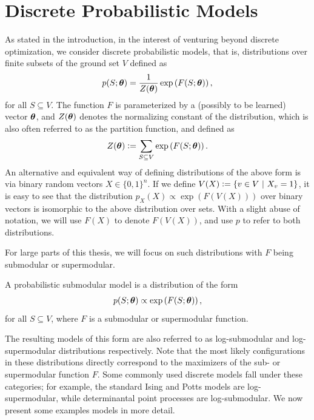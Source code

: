 \section{Discrete Probabilistic Models}
As stated in the introduction, in the interest of venturing beyond discrete optimization, we consider discrete probabilistic models, that is, distributions over finite subsets of the ground set $V$ defined as
\begin{align*}
p(S; \bm{\theta}) = \frac{1}{Z(\bm{\theta})} \exp\left( F(S; \bm{\theta}) \right),
\end{align*}
for all $S \subseteq V$.
The function $F$ is parameterized by a (possibly to be learned) vector $\bm{\theta}$, and $Z(\bm{\theta})$ denotes the normalizing constant of the distribution, which is also often referred to as the partition function, and defined as
\begin{align*}
Z(\bm{\theta}) \vcentcolon= \sum_{S \subseteq V} \exp\left( F(S; \bm{\theta}) \right).
\end{align*}
An alternative and equivalent way of defining distributions of the above form is via binary random vectors $X \in \{0, 1\}^n$.
If we define $V(X) \vcentcolon= \left\{v \in V\ \middle\vert\  X_v = 1\right\}$, it is easy to see that the distribution $p_X(X) \propto \exp(F(V(X)))$ over binary vectors is isomorphic to the above distribution over sets.
With a slight abuse of notation, we will use $F(X)$ to denote $F(V(X))$, and use $p$ to refer to both distributions.

For large parts of this thesis, we will focus on such distributions with $F$ being submodular or supermodular.
\begin{definition}
A probabilistic submodular model \citep{djolonga14,gotovos15} is a distribution of the form
\begin{align*}
p(S; \bm{\theta}) \propto \exp\left( F(S; \bm{\theta}) \right),
\end{align*}
for all $S \subseteq V$, where $F$ is a submodular or supermodular function.
\end{definition}
The resulting models of this form are also referred to as log-submodular and log-supermodular distributions respectively.
Note that the most likely configurations in these distributions directly correspond to the maximizers of the sub- or supermodular function $F$.
Some commonly used discrete models fall under these categories; for example, the standard Ising and Potts models are log-supermodular, while determinantal point processes are log-submodular.
We now present some examples models in more detail.

